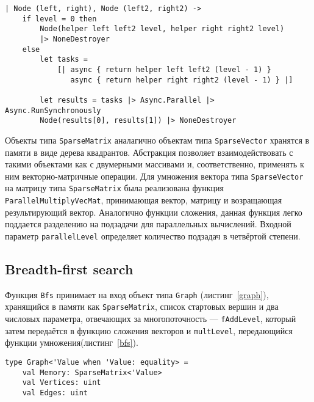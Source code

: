 \begin{lstlisting}[style=codelistingstyle, caption={Разделение задачи сложения двух деревьев на две подзадачи и использование потоков для получения результата},label={addparallel}, frame=single]
| Node (left, right), Node (left2, right2) ->
    if level = 0 then
        Node(helper left left2 level, helper right right2 level)
        |> NoneDestroyer
    else
        let tasks =
            [| async { return helper left left2 (level - 1) }
               async { return helper right right2 (level - 1) } |]

        let results = tasks |> Async.Parallel |> Async.RunSynchronously
        Node(results[0], results[1]) |> NoneDestroyer
\end{lstlisting}

Объекты типа \texttt{SparseMatrix} аналагично объектам типа \texttt{SparseVector} хранятся в памяти в виде дерева квадрантов. Абстракция позволяет взаимодействовать с такими объектами как с двумерными массивами и, соответственно, применять к ним векторно-матричные операции. Для умножения вектора типа \texttt{SparseVector} на матрицу типа \texttt{SparseMatrix} была реализована функция \texttt{ParallelMultiplyVecMat}, принимающая вектор, матрицу и возращающая результирующий вектор. Аналогично функции сложения, данная функция легко поддается разделению на подзадачи для параллельных вычислений. Входной параметр \texttt{parallelLevel} определяет количество подзадач в четвёртой степени.

\subsection{Breadth-first search}
Функция \texttt{Bfs} принимает на вход объект типа \texttt{Graph} (листинг~\ref{graph}), хранящийся в памяти как \texttt{SparseMatrix}, список стартовых вершин и два числовых параметра, отвечающих за многопоточность --- \texttt{fAddLevel}, который затем передаётся в функцию сложения векторов и \texttt{multLevel}, передающийся функции умножения(листинг~\ref{bfs}).

\newpage
\begin{lstlisting}[style=codelistingstyle,caption={Тип Graph},label={graph}, frame=single]
type Graph<'Value when 'Value: equality> =
    val Memory: SparseMatrix<'Value>
    val Vertices: uint
    val Edges: uint
\end{lstlisting}


